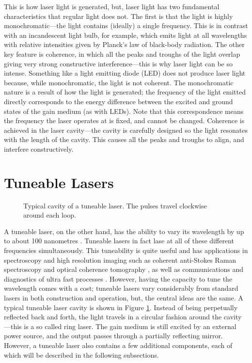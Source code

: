 This is how laser light is generated, but, laser light has two fundamental characteristics that regular light does not. The first is that the light is highly monochromatic---the light contains (ideally) a single frequency. This is in contrast with an incandescent light bulb, for example, which emits light at all wavelengths with relative intensities given by Planck's law of black-body radiation. The other key feature is coherence, in which all the peaks and troughs of the light overlap giving very strong constructive interference---this is why laser light can be so intense. Something like a light emitting diode (LED) does not produce laser light because, while monochromatic, the light is not coherent. The monochromatic nature is a result of how the light is generated; the frequency of the light emitted directly corresponds to the energy difference between the excited and ground states of the gain medium (as with LEDs). Note that this correspondence means the frequency the laser operates at is fixed, and cannot be changed. Coherence is achieved in the laser cavity---the cavity is carefully designed so the light resonates with the length of the cavity. This causes all the peaks and troughs to align, and interfere constructively. \\

\section{Tuneable Lasers}
\begin{figure}[tbp]
\centering

\caption[Typical cavity of a tuneable laser.]{Typical cavity of a tuneable laser. The pulses travel clockwise around each loop.}
\label{fig:cavity}
\end{figure}

A tuneable laser, on the other hand, has the ability to vary its wavelength by up to about 100 nanometres \cite{bohun, burgoyne2010, yamashita}. Tuneable lasers in fact lase at all of these different frequencies simultaneously. This tuneability is quite useful and has applications in spectroscopy and high resolution imaging such as coherent anti-Stokes Raman spectroscopy and optical coherence tomography \cite{bohun, burgoyne2014, yamashita}, as well as communications and diagnostics of ultra fast processes \cite{silfvast}. However, having the capacity to tune the wavelength comes with a cost; tuneable lasers vary considerably from standard lasers in both construction and operation, but, the central ideas are the same. A typical tuneable laser cavity is shown in Figure \ref{fig:cavity}. Instead of being perpetually reflected back and forth, the light travels in a circular fashion around the cavity---this is a so called ring laser. The gain medium is still excited by an external power source, and the output passes through a partially reflecting mirror. However, a tuneable laser also contains a few additional components, each of which will be described in the following subsections. 

